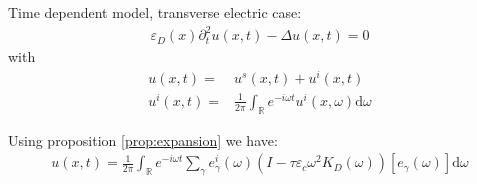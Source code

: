\documentclass[11pt]{article}
\numberwithin{equation}{section}
\newcommand{\R}{\mathbb{R}}
\newcommand{\dd}{\mathrm{d}}
\begin{document}
Time dependent model, transverse electric case:
\begin{align*}
\varepsilon_D(x) \partial_t^2 u(x,t)-\Delta u(x,t) = 0
\end{align*}
with
\begin{align*}
u(x,t)=& u^s(x,t) +u^i(x,t) \\
u^i(x,t) =& \frac{1}{2\pi }\int_\R e^{-i\omega t} u^i(x,\omega) \dd \omega
\end{align*}

Using proposition  \ref{prop:expansion} we have:
\begin{align*}
u(x,t)= \frac{1}{2\pi }\int_\R e^{-i\omega t} \sum_\gamma e_\gamma^i (\omega) \left( I-\tau\varepsilon_c\omega^2 K_D(\omega)\right)[e_\gamma(\omega) ]\dd \omega
\end{align*}




\end{document}
